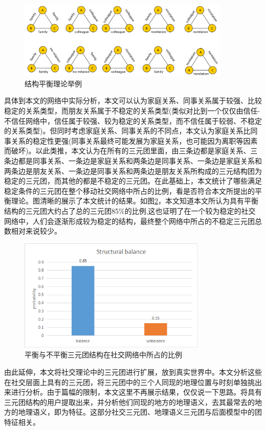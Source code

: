 \begin{figure}[ht]
    \centering
    \includegraphics[scale=1, width=0.9\textwidth]{figure/relations.PNG}
    \caption{结构平衡理论举例}
    \label{fig-structral-balance}
\end{figure}


具体到本文的网络中实际分析，本文可以认为家庭关系、同事关系属于较强、比较稳定的关系类型，而朋友关系属于不稳定的关系类型(类似对比到一个仅仅由信任-不信任网络中，信任属于较强、较为稳定的关系类型，而不信任属于较弱、不稳定的关系类型)。但同时考虑家庭关系、同事关系的不同点，本文认为家庭关系比同事关系的稳定性更强(同事关系最终可能发展为家庭关系，也可能因为离职等因素而破坏)。以此类推，本文认为在所有的三元团里面，由三条边都是家庭关系、三条边都是同事关系、一条边是家庭关系和两条边是同事关系、一条边是家庭关系和两条边是朋友关系、一条边是同事关系和两条边是朋友关系所构成的三元结构团为稳定的三元团，而其他的都是不稳定的三元团。在此基础上，本文统计了哪些满足稳定条件的三元团在整个移动社交网络中所占的比例，看是否符合本文所提出的平衡理论。图清晰的展示了本文统计的结果。如图\ref{fig-structral-balance-stat}，本文知道本文所认为具有平衡结构的三元团大约占了总的三元团85\%的比例,这也证明了在一个较为稳定的社交网络中，人们会逐渐形成较为稳定的结构，最终整个网络中所占的不稳定三元团总数相对来说较少。





\begin{figure}[ht]
    \centering
    \includegraphics[scale=1, width=0.8\textwidth]{figure/structural_balance.PNG}
    \caption{平衡与不平衡三元团结构在社交网络中所占的比例}
    \label{fig-structral-balance-stat}
\end{figure}


由此延伸，本文将社交理论中的三元团进行扩展，放到真实世界中。本文分析这些在社交层面上具有的三元团，将三元团中的三个人同现的地理位置与时刻单独挑出来进行分析。由于篇幅的限制，本文这里不再展示结果，仅仅说一下思路。将具有三元团结构的用户提取出来，并分析他们同现的地方的地理语义，去其最常去的地方的地理语义，即为特征。这部分社交三元团、地理语义三元团与后面模型中的团特征相关。







